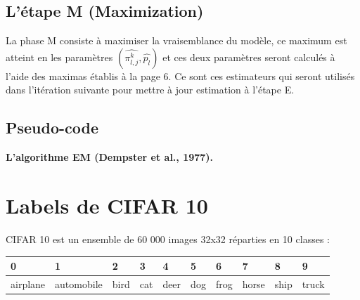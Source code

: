 \documentclass[frenchb]{report}
\newcommand{\1}{\mathbbm{1}}
\theoremstyle{definition}\newtheorem{defn}{Définition}
\theoremstyle{definition}\newtheorem{exm}{Exemple}
\theoremstyle{definition}\newtheorem{nota}{Notation}
\theoremstyle{definition}\newtheorem{rem}{Remarque}
\begin{document}
\section{L'étape M (Maximization)}

La phase M consiste à maximiser la vraisemblance du modèle, ce maximum est atteint en les paramètres $\left(\widehat{\pi^k_{l,j}}, \widehat{p_l} \right)$ et ces deux paramètres seront calculés à l'aide des maximas établis à la page $6$. Ce sont ces estimateurs qui seront utilisés dans l'itération suivante pour mettre à jour estimation à l'étape E.

\section{Pseudo-code}

\begin{algorithm}
	\caption{\textbf{L’algorithme EM (Dempster et al., 1977).}}
	\begin{algorithmic}[1]
		\ENDFOR
	\end{algorithmic}
\end{algorithm}

\chapter{Labels de CIFAR 10}

CIFAR 10 est un ensemble de 60 000 images 32x32 réparties en 10 classes :

\begin{table}[!ht]
    \centering
    \begin{tabular}{|l|l|l|l|l|l|l|l|l|l|}
    \hline
        0 & 1 & 2 & 3 & 4 & 5 & 6 & 7 & 8 & 9 \\ \hline
        airplane & automobile & bird & cat & deer & dog & frog & horse & ship & truck \\ \hline
    \end{tabular}
\end{table}
\end{document}
